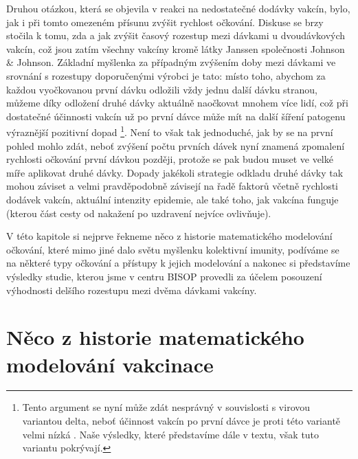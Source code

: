 Druhou otázkou, která se objevila v reakci na nedostatečné dodávky vakcín, bylo, jak i při tomto omezeném přísunu zvýšit rychlost očkování. Diskuse se brzy stočila k tomu, zda a jak zvýšit časový rozestup mezi dávkami u dvoudávkových vakcín, což jsou zatím všechny vakcíny kromě látky Janssen společnosti Johnson \& Johnson. Základní myšlenka za případným zvýšením doby mezi dávkami ve srovnání s rozestupy doporučenými výrobci je tato: místo toho, abychom za každou vyočkovanou první dávku odložili vždy jednu další dávku stranou, můžeme díky odložení druhé dávky aktuálně naočkovat mnohem více lidí, což při dostatečné účinnosti vakcín už po první dávce může mít na další šíření patogenu výraznější pozitivní dopad \cite{Paltiel_etal2021,Tuite_etal2021}\footnote{Tento argument se nyní může zdát nesprávný v souvislosti s virovou variantou delta, neboť účinnost vakcín po první dávce je proti této variantě velmi nízká \cite{delta}. Naše výsledky, které představíme dále v textu, však tuto variantu pokrývají.}. Není to však tak jednoduché, jak by se na první pohled mohlo zdát, neboť zvýšení počtu prvních dávek nyní znamená zpomalení rychlosti očkování první dávkou později, protože se pak budou muset ve velké míře aplikovat druhé dávky. Dopady jakékoli strategie odkladu druhé dávky tak mohou záviset a velmi pravděpodobně závisejí na řadě faktorů včetně rychlosti dodávek vakcín, aktuální intenzity epidemie, ale také toho, jak vakcína funguje (kterou část cesty od nakažení po uzdravení nejvíce ovlivňuje). 

V této kapitole si nejprve řekneme něco z historie matematického modelování očkování, které mimo jiné dalo světu myšlenku kolektivní imunity, podíváme se na některé typy očkování a přístupy k jejich modelování a nakonec si představíme výsledky studie, kterou jsme v centru BISOP provedli za účelem posouzení výhodnosti delšího rozestupu mezi dvěma dávkami vakcíny.

\section*{Něco z historie matematického modelování vakcinace}

